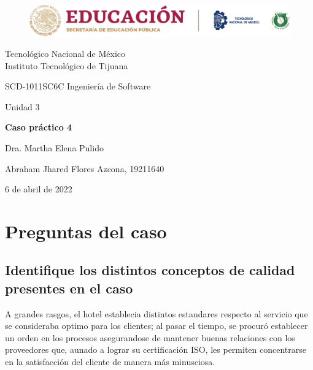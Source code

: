 \documentclass[stu, 12pt, letterpaper, donotrepeattitle, floatsintext, natbib]{apa7}
\begin{document}
    \begin{titlepage}
        \begin{figure}[ht]
            \centering
            \includegraphics[width=15cm]{logosITT.png}
        \end{figure}
        \centering
        {\Large Tecnológico Nacional de México\\Instituto Tecnológico de Tijuana\par}
        \vspace{1cm}
        {\Large SCD-1011SC6C Ingeniería de Software\par}
        \vspace{1cm}
        {\Large Unidad 3\par}
        \vspace{2cm}
        {\Large\bfseries Caso práctico 4\par}
        \vspace{2cm}
        {\large Dra. Martha Elena Pulido\par}
        \vfill
            {\large Abraham Jhared Flores Azcona, 19211640\par}
        \vfill
        {\large 6 de abril de 2022}
    \end{titlepage}


\newpage
\section*{Preguntas del caso}
\subsection*{Identifique los distintos conceptos de calidad presentes en el caso}
 \begin{justifying}
A grandes rasgos, el hotel establecia distintos estandares respecto al servicio que se consideraba optimo para los clientes;
al pasar el tiempo, se procuró establecer un orden en los procesos asegurandose de mantener
buenas relaciones con los proveedores que, aunado a lograr su certificación ISO, les permiten concentrarse
en la satisfacción del cliente de manera más minusciosa.\par
 \end{justifying}
\vspace{\baselineskip}
\end{document}
